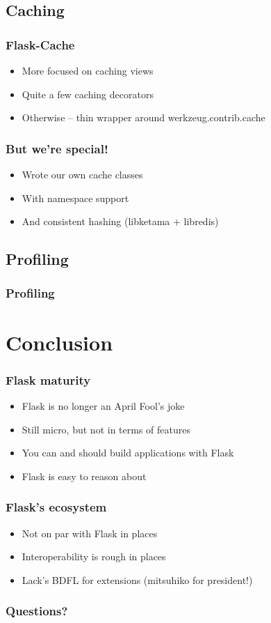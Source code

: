 \documentclass{beamer}
\begin{document}
\subsection{Caching}

\begin{frame}
  \frametitle{Flask-Cache}
  \begin{itemize}
  \item More focused on caching views
  \item Quite a few caching decorators
  \item Otherwise -- thin wrapper around werkzeug.contrib.cache
  \end{itemize}
\end{frame}

\begin{frame}
  \frametitle{But we're special!}
  \begin{itemize}
  \item Wrote our own cache classes
  \item With namespace support
  \item And consistent hashing (libketama + libredis)
  \end{itemize}
\end{frame}

\subsection{Profiling}

\begin{frame}
  \frametitle{Profiling}
\end{frame}

\section*{Conclusion}

\begin{frame}
  \frametitle{Flask maturity}
  \begin{itemize}
  \item Flask is no longer an April Fool's joke
  \item Still micro, but not in terms of features
  \item You can and should build applications with Flask
  \item Flask is easy to reason about
  \end{itemize}
\end{frame}

\begin{frame}
  \frametitle{Flask's ecosystem}
  \begin{itemize}
  \item Not on par with Flask in places
  \item Interoperability is rough in places
  \item Lack's BDFL for extensions (mitsuhiko for president!)
  \end{itemize}
\end{frame}

\begin{frame}
  \frametitle{Questions?}
\end{frame}
\end{document}

